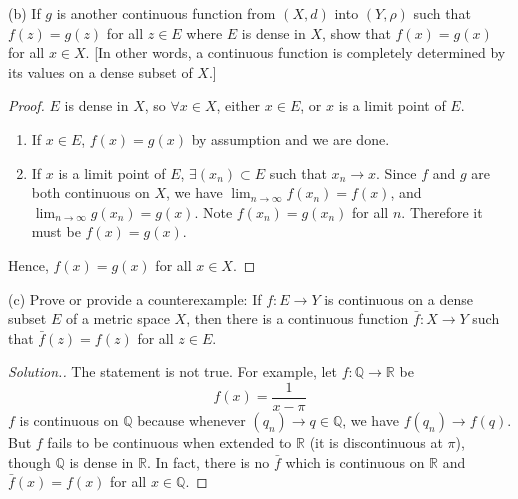 \documentclass[11pt,a4paper]{amsart}
\def\R{{\mathbb R}}
\def\Q{{\mathbb Q}}
\begin{document}
(b) If $g$ is another continuous function from $(X,d)$ into $(Y,\rho)$ such that $f(z)=g(z)$
for all $z\in E$ where $E$ is dense in $X$, show that $f(x)=g(x)$ for all $x\in X$.
[In other words, a continuous function is completely determined by its values on a dense subset
of $X$.]

\begin{proof}
  $E$ is dense in $X$, so $\forall x\in X$, either $x\in E$, or $x$ is a limit point of $E$.

  \begin{enumerate}
    \item If $x\in E$, $f(x)=g(x)$ by assumption and we are done.
    \item If $x$ is a limit point of $E$, $\exists (x_n)\subset E$ such that $x_n\to x$.
          Since $f$ and $g$ are both continuous on $X$, we have $\lim_{n\to\infty} f(x_n) = f(x)$, and
          $\lim_{n\to\infty} g(x_n) = g(x)$.
          Note $f(x_n) = g(x_n)$ for all $n$.
          Therefore it must be $f(x) = g(x)$.
  \end{enumerate}

  Hence, $f(x)=g(x)$ for all $x\in X$.
\end{proof}
\medskip

(c) Prove or provide a counterexample: If $f:E\rightarrow Y$ is continuous on a dense subset
$E$ of a metric space $X$, then there is a continuous function $\bar f:X\rightarrow Y$
such that $\bar f(z)=f(z)$ for all $z\in E$.

\begin{proof}[Solution.]
  The statement is not true.
  For example, let $f: \Q \to \R$ be
  $$f(x) = \frac{1}{x-\pi}$$
  $f$ is continuous on $\Q$ because whenever $(q_n) \to q \in \Q$, we have $f(q_n)\to f(q)$.
  But $f$ fails to be continuous when extended to $\R$ (it is discontinuous at $\pi$),
  though $\Q$ is dense in $\R$. In fact, there is no $\bar{f}$ which is continuous on $\R$
  and $\bar{f}(x) = f(x)$ for all $x\in\Q$.
\end{proof}
\medskip


%
\end{document}
